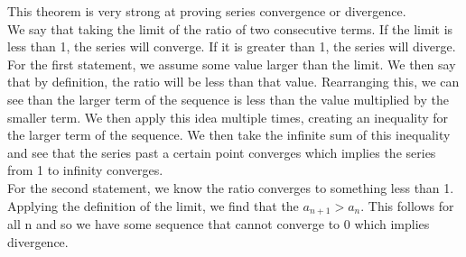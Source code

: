 \documentclass[12pt]{article}
\begin{document}
\begin{explanation}{}
    This theorem is very strong at proving series convergence or divergence.\\
We say that taking the limit of the ratio of two consecutive terms. If the limit is less than 1, the series will converge. If it is greater than 1, the series will diverge. For the first statement, we assume some value larger than the limit. We then say that by definition, the ratio will be less than that value. Rearranging this, we can see than the larger term of the sequence is less than the value multiplied by the smaller term. We then apply this idea multiple times, creating an inequality for the larger term of the sequence. We then take the infinite sum of this inequality and see that the series past a certain point converges which implies the series from 1 to infinity converges.\\
For the second statement, we know the ratio converges to something less than 1. Applying the definition of the limit, we find that the $a_{n+1} > a_n$. This follows for all n and so we have some sequence that cannot converge to 0 which implies divergence. 
\end{explanation}
\end{document}
